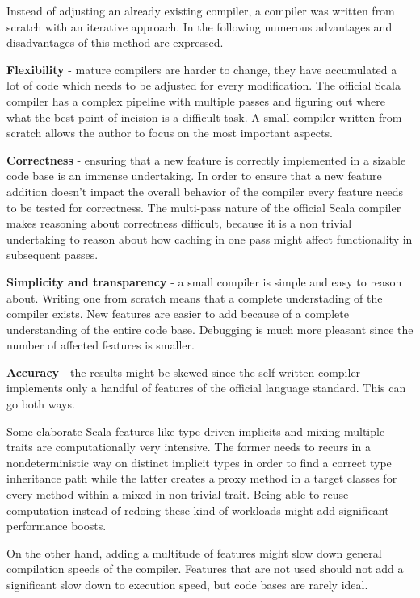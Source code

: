 \documentclass{VUMIFPSbakalaurinis}
\begin{document}
Instead of adjusting an already existing compiler, a compiler was written from scratch with an iterative approach.
In the following numerous advantages and disadvantages of this method are expressed.

\textbf{Flexibility} - mature compilers are harder to change, they have accumulated a lot of code which needs to be adjusted for every modification.
The official Scala compiler has a complex pipeline with multiple passes and figuring out where what the best point of incision is a difficult task.
A small compiler written from scratch allows the author to focus on the most important aspects.

\textbf{Correctness} - ensuring that a new feature is correctly implemented in a sizable code base is an immense undertaking.
In order to ensure that a new feature addition doesn't impact the overall behavior of the compiler every feature needs to be tested for correctness.
The multi-pass nature of the official Scala compiler makes reasoning about correctness difficult, because it is a non trivial undertaking to reason about how caching in one pass might affect functionality in subsequent passes.

\textbf{Simplicity and transparency} - a small compiler is simple and easy to reason about.
Writing one from scratch means that a complete understading of the compiler exists.
New features are easier to add because of a complete understanding of the entire code base.
Debugging is much more pleasant since the number of affected features is smaller.

\textbf{Accuracy} - the results might be skewed since the self written compiler implements only a handful of features of the official language standard.
This can go both ways.

Some elaborate Scala features like type-driven implicits and mixing multiple traits are computationally very intensive.
The former needs to recurs in a nondeterministic way on distinct implicit types in order to find a correct type inheritance path while the latter creates a proxy method in a target classes for every method within a mixed in non trivial trait.
Being able to reuse computation instead of redoing these kind of workloads might add significant performance boosts.

On the other hand, adding a multitude of features might slow down general compilation speeds of the compiler.
Features that are not used should not add a significant slow down to execution speed, but code bases are rarely ideal.
\end{document}
